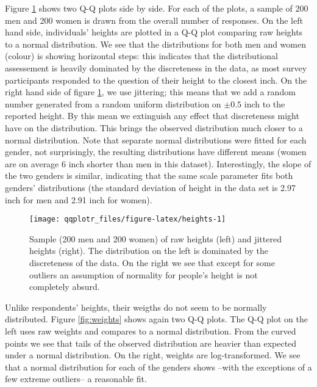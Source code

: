 Figure \ref{fig:heights} shows two Q-Q plots side by side. For each of
the plots, a sample of 200 men and 200 women is drawn from the overall
number of responses. On the left hand side, individuals' heights are
plotted in a Q-Q plot comparing raw heights to a normal distribution. We
see that the distributions for both men and women (colour) is showing
horizontal steps: this indicates that the distributional assessement is
heavily dominated by the discreteness in the data, as most survey
participants responded to the question of their height to the closest
inch. On the right hand side of figure \ref{fig:heights}, we use
jittering; this means that we add a random number generated from a
random uniform distribution on \(\pm 0.5\) inch to the reported height.
By this mean we extinguish any effect that discreteness might have on
the distribution. This brings the observed distribution much closer to a
normal distribution. Note that separate normal distributions were fitted
for each gender, not surprisingly, the resulting distributions have
different means (women are on average 6 inch shorter than men in this
dataset). Interestingly, the slope of the two genders is similar,
indicating that the same scale parameter fits both genders'
distributions (the standard deviation of height in the data set is 2.97
inch for men and 2.91 inch for women).

\begin{Schunk}
\begin{figure}

{\centering \texttt{[image: qqplotr\_files/figure-latex/heights-1]} 

}

\caption[Sample (200 men and 200 women) of raw heights (left) and jittered heights (right)]{Sample (200 men and 200 women) of raw heights (left) and jittered heights (right). The distribution on the left is dominated by the discreteness of the data. On the right we see that except for some outliers an assumption of normality for people's height is not completely absurd.}\label{fig:heights}
\end{figure}
\end{Schunk}

Unlike respondents' heights, their weigths do not seem to be normally
distributed. Figure \ref{fig:weights} shows again two Q-Q plots. The Q-Q
plot on the left uses raw weights and compares to a normal distribution.
From the curved points we see that tails of the observed distribution
are heavier than expected under a normal distribution. On the right,
weights are log-transformed. We see that a normal distribution for each
of the genders shows --with the exceptions of a few extreme outliers-- a
reasonable fit.

